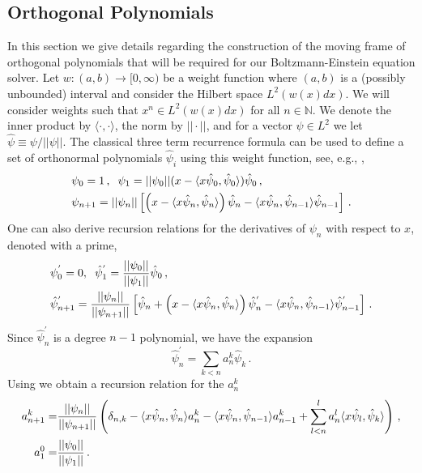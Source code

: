 \subsection{Orthogonal Polynomials}\label{orthopoly_app}
In this section we give details regarding the construction of the moving frame of orthogonal polynomials that will be required for our Boltzmann-Einstein equation solver.
\label{ortho-general}
Let $w:(a,b)\rightarrow [0,\infty)$ be a weight function where $(a,b)$ is a (possibly unbounded) interval and consider the Hilbert space $L^2(w(x) dx)$.   We will consider weights such that $x^n\in L^2(w(x) dx)$ for all $n\in\mathbb{N}$. We denote the inner product by $\langle\cdot,\cdot\rangle$, the norm by $||\cdot||$, and for a vector $\psi\in L^2$ we let $\hat{\psi}\equiv \psi/||\psi||$.  The classical three term recurrence formula can be used to define a set of orthonormal polynomials $\hat{\psi}_i$ using this weight function, see, e.g.,  \cite{Olver},
\begin{align}\label{poly_recursion}
&\psi_0=1\,, \hspace{2mm} \psi_1=||\psi_0||(x-\langle x\hat\psi_0,\hat{\psi}_0\rangle)\hat{\psi}_0\,,\\
&\psi_{n+1}=||\psi_n||\left[\left(x-\langle x\hat\psi_n,\hat\psi_n\rangle\right)\hat\psi_n-\langle x\hat\psi_n,\hat\psi_{n-1}\rangle\hat\psi_{n-1}\right]\,.\notag
\end{align}
One can also derive recursion relations for the derivatives of $\psi_n$ with respect to $x$, denoted with a prime,
\begin{align}\label{deriv_rec}
&\psi_0^{'}=0, \hspace{2mm} \hat{\psi}_1^{'}=\frac{||\psi_0||}{||\psi_1||}\hat\psi_0\,,\\
&\hat{\psi}_{n+1}^{'}=\frac{||\psi_n||}{||\psi_{n+1}||}\left[\hat\psi_n+\left(x-\langle x\hat\psi_n,\hat\psi_n\rangle\right)\hat{\psi}_n^{'}-\langle x\hat\psi_n,\hat\psi_{n-1}\rangle\hat{\psi}_{n-1}^{'}\right]\,.\notag
\end{align}
Since $\hat{\psi}_n^{'}$ is a degree $n-1$ polynomial, we have the expansion 
\begin{equation}
\hat{\psi}_n^{'}=\sum_{k<n} a_n^k \hat{\psi}_k\,.
\end{equation}
Using  we obtain a recursion relation for the $a_n^k$
\begin{align}
a_{n+1}^k=&\frac{||\psi_n||}{||\psi_{n+1}||}\left(\delta_{n,k}-\langle x\hat\psi_n,\hat\psi_{n}\rangle a_n^k-\langle x\hat\psi_n,\hat\psi_{n-1}\rangle a_{n-1}^k+\sum_{l<n}^la_n^l\langle x\hat\psi_l,\hat\psi_k\rangle\right)\,,\notag\\
a_1^0=&\frac{||\psi_0||}{||\psi_1||}\,.\notag
\end{align}

